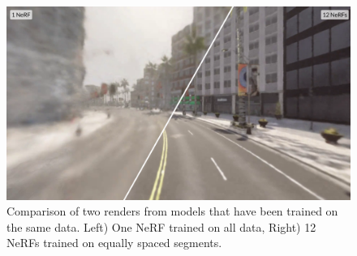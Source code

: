 \begin{figure}[!h]
    \centering
    \includegraphics[width=1.0\textwidth]{figures/block-nerf-comparison.png}
    \caption[Comparison of regular NeRF vs. Block-NeRF approach]{Comparison of two renders from models that have been trained on the same data. Left) One NeRF trained on all data, Right) 12 NeRFs trained on equally spaced segments.}
    \label{fig:block-nerf-comparison}
\end{figure}